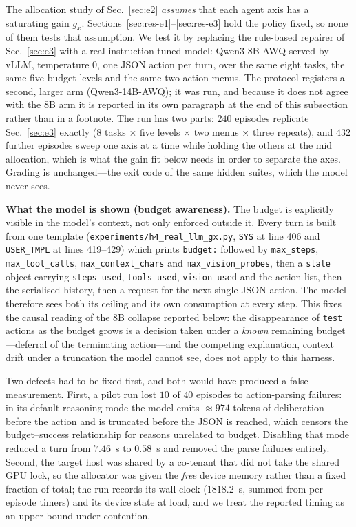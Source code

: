\documentclass[10pt]{article} %
\begin{document}
The allocation study of Sec.~\ref{sec:e2} \emph{assumes} that each agent axis has a
saturating gain $g_x$. Sections~\ref{sec:res-e1}--\ref{sec:res-e3} hold the policy
fixed, so none of them tests that assumption. We test it by replacing the rule-based
repairer of Sec.~\ref{sec:e3} with a real instruction-tuned model: Qwen3-8B-AWQ served
by vLLM, temperature $0$, one JSON action per turn, over the same eight tasks, the same
five budget levels and the same two action menus. The protocol registers a second, larger
arm (Qwen3-14B-AWQ); it was run, and because it does not agree with the $8$B arm it is
reported in its own paragraph at the end of this subsection rather than in a footnote.
The run has two parts: $240$
episodes replicate Sec.~\ref{sec:e3} exactly ($8$ tasks $\times$ five levels
$\times$ two menus $\times$ three repeats), and $432$ further episodes sweep one
axis at a time while holding the others at the mid allocation, which is what the
gain fit below needs in order to separate the axes. Grading is unchanged---the exit code of the same hidden suites, which the model never sees.

\textbf{What the model is shown (budget awareness).} The budget is explicitly visible in the
model's context, not only enforced outside it. Every turn is built from one template
(\texttt{experiments/h4\_real\_llm\_gx.py}, \texttt{SYS} at line 406 and \texttt{USER\_TMPL}
at lines 419--429) which prints \texttt{budget:} followed by \texttt{max\_steps},
\texttt{max\_tool\_calls}, \texttt{max\_context\_chars} and \texttt{max\_vision\_probes}, then
a \texttt{state} object carrying \texttt{steps\_used}, \texttt{tools\_used},
\texttt{vision\_used} and the action list, then the serialised history, then a request for
the next single JSON action. The model therefore sees both its ceiling and its own
consumption at every step. This fixes the causal reading of the $8$B collapse reported below:
the disappearance of \texttt{test} actions as the budget grows is a decision taken under a
\emph{known} remaining budget---deferral of the terminating action---and the competing
explanation, context drift under a truncation the model cannot see, does not apply to this
harness.

Two defects had to be fixed first, and both would have produced a false measurement.
First, a pilot run lost $10$ of $40$ episodes to action-parsing failures: in its default
reasoning mode the model emits $\approx\!974$ tokens of deliberation before the action
and is truncated before the JSON is reached, which censors the budget--success
relationship for reasons unrelated to budget. Disabling that mode reduced a turn from
$7.46$~s to $0.58$~s and removed the parse failures entirely. Second, the target host was
shared by a co-tenant that did not take the shared GPU lock, so the allocator was given
the \emph{free} device memory rather than a fixed fraction of total; the run records its
wall-clock ($1818.2$~s, summed from per-episode timers) and its device state at load, and
we treat the reported timing as an upper bound under contention.
\end{document}
